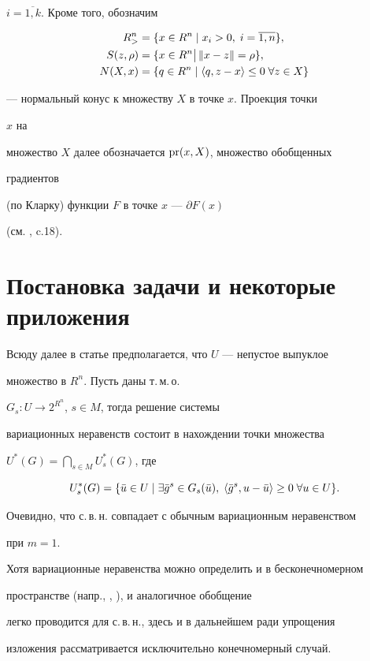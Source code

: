 $i=\overline{1,k}$. Кроме того, обозначим


\begin{align*}


R^n_{>}&=\{x\in R^n\mid x_i>0,\;i=\overline{1,n}\},\\


S(z,\rho)&=\{x\in R^n\bigl.\bigr|\,\|x-z\|=\rho\},\\


N(X,x)&=\{q\in R^n\mid\la q,z-x\ra\le 0\;\forall z\in X\}


\end{align*}


--- нормальный конус к множеству $X$ в точке $x$. Проекция точки


$x$ на


множество $X$ далее обозначается $\operatorname{pr}(x,X)$, множество обобщенных


градиентов


(по Кларку) функции $F$ в точке $x$ --- $\partial F(x)$


(см. \cite{Cl}, c.18).





\section{Постановка задачи и некоторые приложения}





Всюду далее в статье предполагается, что $U$ --- непустое выпуклое


множество в $R^n$. Пусть даны т.\,м.\,о.


$G_s:U\to 2^{R^n}$, $s\in M$, тогда решение системы


вариационных неравенств состоит в нахождении точки множества


$U^*(G)=\bigcap\limits_{s\in M}U^*_s(G)$, где


$$


U^*_s(G)=\{\Bar u\in U\mid\exists\Bar g^s\in G_s(\Bar u),\;


\la\Bar g^s,u-\Bar u\ra\ge 0\;\forall u\in U\}.


$$


Очевидно, что с.\,в.\,н. совпадает с обычным вариационным неравенством


при $m=1$.





\begin{notes}


Хотя вариационные неравенства можно определить и в бесконечномерном


пространстве (напр., \cite{Kin}, \cite{Pan}), и аналогичное обобщение


легко проводится для с.\,в.\,н., здесь и в дальнейшем ради упрощения


изложения рассматривается исключительно конечномерный случай.


\end{notes}





